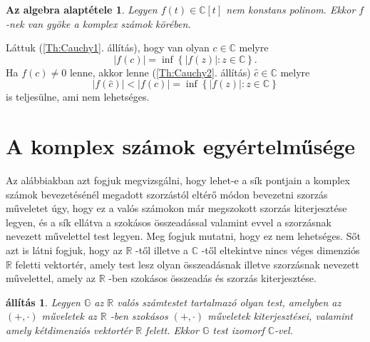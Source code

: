 \documentclass[9pt, a4paper, showtrims]{memoir}
\makeatletter
\renewenvironment{proof}[1][\proofname]
    {\par\pushQED{\qed}%
    \normalfont \topsep6\p@\@plus6\p@\relax
    \trivlist
    \item[\hskip\labelsep
        \itshape
    #1\@addpunct{:}]\ignorespaces}
    {\popQED\endtrivlist\@endpefalse}
\theoremstyle{plain}
\newtheorem{proposition}{állítás}[chapter]
\newtheorem*{FA}{Az algebra alaptétele}
\theoremstyle{remark}
\theoremstyle{definition}
\makeatother
\begin{document}
\begin{FA}\label{Th:FundOfAlg}
    Legyen $f\left( t \right)\in\mathbb{C}[t]$ nem konstans polinom.
    Ekkor $f$-nek van gyöke a komplex számok körében.
\end{FA}

\begin{proof}
    Láttuk (\ref{Th:Cauchy1}. állítás), hogy van olyan $c\in \mathbb{C}$ melyre 
    \[
        \left| f\left( c\right) \right| =\inf \left\{ \left| f\left( z\right)
            \right| :z\in \mathbb{C}\right\} \text{.}
    \]
    Ha $f(c)\neq 0$ lenne, akkor lenne (\ref{Th:Cauchy2}. állítás) $\hat{c}\in \mathbb{C}$ melyre 
    \[
        \left| f\left( \hat{c}\right) \right| <\left| f\left( c\right) \right| =\inf
        \left\{ \left| f\left( z\right) \right| :z\in \mathbb{C}\right\} 
    \]
    is teljesülne, ami nem lehetséges.
\end{proof}

\section{A komplex számok egyértelműsége}

Az alábbiakban azt fogjuk megvizsgálni, hogy lehet-e a sík pontjain
a komplex számok bevezetésénél megadott szorzástól eltérő
módon bevezetni szorzás műveletet úgy, hogy ez a valós számokon
már megszokott szorzás kiterjesztése legyen, és a sík ellátva
a szokásos összeadással valamint evvel a szorzásnak nevezett művelettel test legyen.
Meg fogjuk mutatni, hogy ez nem lehetséges.
Sőt
azt is látni fogjuk, hogy az $\mathbb{R}$ -től illetve a $\mathbb{C}$ -től
eltekintve nincs véges dimenziós $\mathbb{R}$ feletti vektortér, amely
test lesz olyan összeadásnak illetve szorzásnak nevezett művelettel, 
amely az $\mathbb{R}$ -ben szokásos összeadás és szorzás kiterjesztése.

\begin{proposition}
    \label{Th:CUnique1}Legyen $\mathbb{G}$ az $\mathbb{R}$ valós számtestet
    tartalmazó olyan test, amelyben az $\left( +,\cdot \right) $ műveletek az $\mathbb{R}$ -ben szokásos $\left( +,\cdot \right) $ műveletek kiterjesztései, valamint amely kétdimenziós vektortér $\mathbb{R}$ felett.
    Ekkor $\mathbb{G}$ test izomorf $\mathbb{C}$-vel.
\end{proposition}
\end{document}
